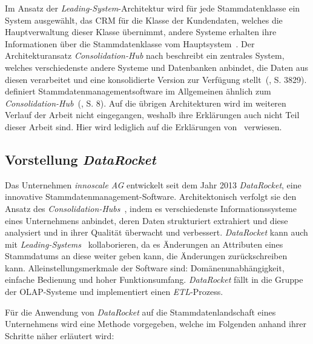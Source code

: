 \documentclass[
  language=german, %
  type=bachelor,%
  ngerman
]{isthesis}
\begin{document}
\begin{content}
  Im Ansatz der \textit{Leading-System}-Architektur wird für jede
  Stammdatenklasse ein System ausgewählt, \zB{} das \acrshort{CRM} für die
  Klasse der Kundendaten, welches die Hauptverwaltung dieser Klasse übernimmt,
  andere Systeme erhalten ihre Informationen über die Stammdatenklasse vom
  Hauptsystem~\cite[][S. 3829]{baghi2014toward}. Der Architekturansatz
  \textit{Consolidation-Hub} nach \textsc{\citeauthor{baghi2014toward}}
  beschreibt ein zentrales System, welches verschiedenste andere Systeme und
  Datenbanken anbindet, die Daten aus diesen verarbeitet und eine konsolidierte
  Version zur Verfügung stellt~(\citeyear{baghi2014toward}, S. 3829).
  \textsc{\citeauthor{loshin2010master}} definiert Stammdatenmanagementsoftware
  im Allgemeinen ähnlich zum
  \textit{Consolidation-Hub}~(\citeyear{loshin2010master}, S. 8). Auf die
  übrigen Architekturen wird im weiteren Verlauf der Arbeit nicht eingegangen,
  weshalb ihre Erklärungen auch nicht Teil dieser Arbeit sind. Hier wird
  lediglich auf die Erklärungen von~\textsc{\citeauthor{baghi2014toward}}
  \citeyearpar{baghi2014toward} verwiesen.


  \subsection{Vorstellung \textit{DataRocket}}\label{sec:Vorstellung-DataRocket}

	Das Unternehmen \textit{innoscale AG} entwickelt seit dem Jahr 2013
	\textit{DataRocket}, eine innovative Stammdatenmanagement-Software.
	Architektonisch verfolgt sie den Ansatz des
  \textit{Consolidation-Hubs}~\cite[][]{baghi2014toward}, indem es
	verschiedenste Informationssysteme eines Unternehmens anbindet, deren Daten
	strukturiert extrahiert und diese analysiert und in ihrer Qualität überwacht
	und verbessert. \textit{DataRocket} kann auch mit
  \textit{Leading-Systems}~\cite[][]{baghi2014toward}
	kollaborieren, da es Änderungen an Attributen eines Stammdatums an diese
	weiter geben kann, \bzw{} die Änderungen zurückschreiben kann.
	Alleinstellungsmerkmale der Software sind: Domänenunabhängigkeit, einfache
	Bedienung und hoher Funktionsumfang. \textit{DataRocket} fällt in die Gruppe der
	\acrshort{OLAP}-Systeme und implementiert einen
	\textit{\acrlong{ETL}}-Prozess.

	Für die Anwendung von \textit{DataRocket} auf die Stammdatenlandschaft eines
	Unternehmens wird eine Methode vorgegeben, welche im Folgenden anhand ihrer
	Schritte näher erläutert wird:


\end{content}
\end{document}
